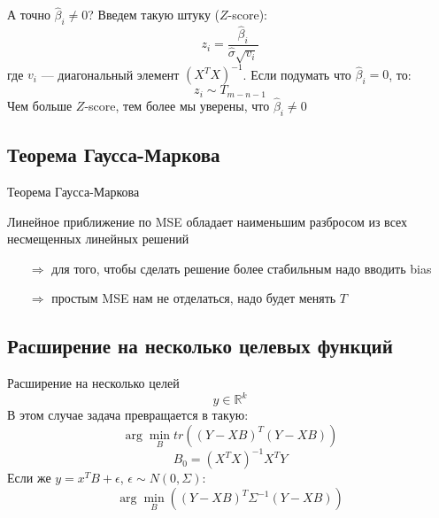 \documentclass[14pt, fleqn, xcolor={dvipsnames, table}]{beamer}
\begin{document}
\begin{frame}{А точно $\hat{\beta}_i \ne 0$?}
Введем такую штуку ($Z$-score):
$$
z_i = \frac{\hat{\beta}_i}{\hat{\sigma}\sqrt{v_i}}
$$
где $v_i$ --- диагональный элемент $\left(X^TX\right)^{-1}$. Если подумать что $\hat{\beta}_i = 0$, то:
$$
z_i \sim T_{m-n-1}
$$
Чем больше $Z$-score, тем более мы уверены, что $\hat{\beta}_i \ne 0$
\end{frame}

\subsection{Теорема Гаусса-Маркова}
\begin{frame}{Теорема Гаусса-Маркова}
\begin{theorem}[]
Линейное приближение по MSE обладает наименьшим разбросом из всех несмещенных линейных решений
\end{theorem}
\begin{itemize}
\item[$\Rightarrow$] для того, чтобы сделать решение более стабильным надо вводить bias
\item[$\Rightarrow$] простым MSE нам не отделаться, надо будет менять $T$
\end{itemize}
\end{frame}

\subsection{Расширение на несколько целевых функций}
\begin{frame}{Расширение на несколько целей}
$$
y \in \mathbb{R}^k
$$
В этом случае задача превращается в такую:
$$
\arg \min_B tr\left((Y - XB)^T(Y - XB)\right)
$$
$$
B_0 = \left(X^TX\right)^{-1} X^TY
$$
Если же $y = x^TB + \epsilon$, $\epsilon \sim N(0, \Sigma)$:
$$
\arg \min_B \left((Y - XB)^T\Sigma^{-1}(Y - XB)\right)
$$
\end{frame}
\end{document}
